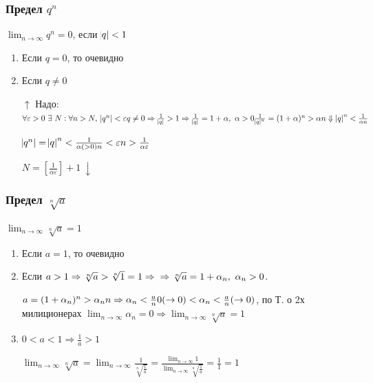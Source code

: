 \documentclass{article}
\begin{document}
    \subsubsection{Предел \(q^n\)}
    
    \(\lim_{n \rightarrow \infty}{q^n} = 0\), если \(\abs{q} < 1\)
        
        \begin{enumerate}
        	\item Если \(q = 0\), то очевидно
            
            \item Если \(q \not = 0\)
            
            \(\uparrow\) Надо: \(\forall \varepsilon > 0\ \exists\ N : \forall n > N,\ \abs{q^n} < \varepsilon
            \\ q \not = 0 \Rightarrow \frac{1}{\abs{q}} > 1 \Rightarrow \frac{1}{\abs{q}} = 1 + \alpha,\ \alpha > 0\\
            \frac{1}{\abs{q}^n} = (1 + \alpha)^n > \alpha n\\ \Downarrow\\ \abs{q}^n < \frac{1}{\alpha n}\)
            
            \(\abs{q^n} = \abs{q}^n < \frac{1}{\alpha(> 0) n} < \varepsilon\\ n > \frac{1}{\alpha \varepsilon}\)
            
            \(N = [\frac{1}{\alpha \varepsilon}] + 1\ \downarrow\)
        \end{enumerate}
        
    \subsubsection{Предел \(\sqrt[n]{a}\)}
        
        \(\lim_{n \rightarrow \infty}{\sqrt[n]{a}} = 1\)
        \begin{enumerate}
        	\item Если \(a = 1\), то очевидно
            
            \item Если \(a > 1 \Rightarrow \sqrt[n]{a} > \sqrt[a]{1} = 1 \Rightarrow\\
            \Rightarrow \sqrt[n]{a} = 1 + \alpha_n,\ \alpha_n > 0\).
            
            \(a = (1 + \alpha_n)^n > \alpha_n n \Rightarrow \alpha_n < \frac{a}{n}\\
            0(\rightarrow 0) < \alpha_n < \frac{a}{n}(\rightarrow 0)\), по Т. о 2х милиционерах \(\lim_{n \rightarrow \infty}{\alpha_n} = 0 \Rightarrow \lim_{n \rightarrow \infty}{\sqrt[n]{a}} = 1\)
            
            \item \(0 < a < 1 \Rightarrow \frac{1}{a} > 1\)
            
            \(\lim_{n \rightarrow \infty}{\sqrt[n]{a}} = \lim_{n \rightarrow \infty}{\frac{1}{\sqrt[n]{\frac{1}{a}}}} = \frac{\lim_{n \rightarrow \infty}{1}}{\lim_{n \rightarrow \infty}{\sqrt[n]{\frac{1}{a}}}}
            = \frac{1}{1} = 1\)
        \end{enumerate}
        
\end{document}
